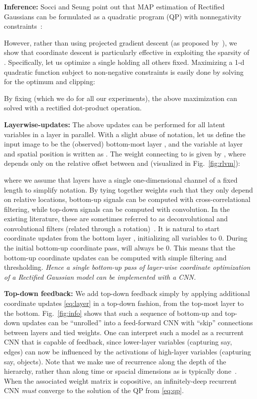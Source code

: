 \documentclass[10pt,twocolumn,letterpaper]{article}
\begin{document}
{\bf Inference:} Socci and Seung point out that MAP estimation of
Rectified Gaussians can be formulated as a quadratic program (QP) with
nonnegativity constraints~\cite{socci1998rectified}:

However, rather than using projected gradient descent (as proposed
by~\cite{socci1998rectified}), we show that coordinate descent is
particularly effective in exploiting the sparsity of
. Specifically, let us optimize a single  holding all others
fixed. Maximizing a 1-d quadratic function subject to non-negative
constraints is easily done by solving for the optimum and clipping:

By fixing  (which we do for all our experiments), the above maximization can solved with a rectified dot-product operation.

{\bf Layerwise-updates:} The above updates can be performed for all latent variables in a layer in parallel. With a slight abuse of
notation, let us define the input image to be the (observed) bottom-most
layer , and the variable at layer  and spatial position 
is written as . The weight connecting  to
 is given by , where  depends only
on the relative offset between  and  (visualized in
Fig.~\ref{fig:rlvm}):

\noindent where we assume that layers have a single one-dimensional
channel of a fixed length to simplify notation. By tying together
weights such that they only depend on relative locations, bottom-up
signals can be computed with cross-correlational filtering, while
top-down signals can be computed with convolution. In the existing
literature, these are sometimes referred to as deconvolutional and
convolutional filters (related through a 
rotation)~\cite{zeiler2010deconvolutional}. It is natural to start
coordinate updates from the bottom layer , initializing all
variables to 0. During the initial bottom-up coordinate pass, 
will always be 0. This means that the bottom-up coordinate updates can
be computed with simple filtering and thresholding. {\em Hence a
  single bottom-up pass of layer-wise coordinate optimization of a
  Rectified Gaussian model can be implemented with a CNN.}

{\bf Top-down feedback:} We add top-down feedback simply by applying
additional coordinate updates \eqref{eq:layer} in a top-down fashion,
from the top-most layer to the bottom. Fig.~\ref{fig:info} shows that
such a sequence of bottom-up and top-down updates can be ``unrolled''
into a feed-forward CNN with ``skip'' connections between layers and
tied weights. One can interpret such a model as a recurrent CNN that
is capable of feedback, since lower-layer variables (capturing say,
edges) can now be influenced by the activations of high-layer
variables (capturing say, objects).  Note that we make use of
recurrence along the depth of the hierarchy, rather than along time or
spacial dimensions as is typically done~\cite{haykin2009neural}. When
the associated weight matrix  is copositive, an infinitely-deep
recurrent CNN {\em must} converge to the solution of the QP from
\eqref{eq:qp}.
\end{document}
